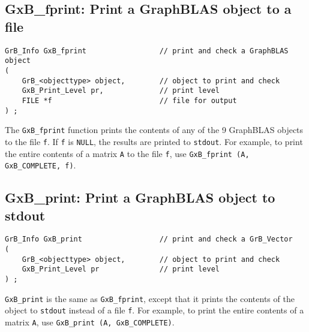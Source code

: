 \documentclass[12pt]{article}
\begin{document}
\newpage
\subsection{{\sf GxB\_fprint:} Print a GraphBLAS object to a file} %

\begin{mdframed}[userdefinedwidth=6in]
{\footnotesize
\begin{verbatim}
GrB_Info GxB_fprint                 // print and check a GraphBLAS object
(
    GrB_<objecttype> object,        // object to print and check
    GxB_Print_Level pr,             // print level
    FILE *f                         // file for output
) ;
\end{verbatim} } \end{mdframed}

The \verb'GxB_fprint' function prints the contents of any of the 9 GraphBLAS
objects to the file \verb'f'.  If \verb'f' is \verb'NULL', the results are
printed to \verb'stdout'.  For example, to print the entire contents of a
matrix \verb'A' to the file \verb'f', use
\verb'GxB_fprint (A, GxB_COMPLETE, f)'.

\subsection{{\sf GxB\_print:} Print a GraphBLAS object to {\sf stdout}} %
\label{gxb_print}

\begin{mdframed}[userdefinedwidth=6in]
{\footnotesize
\begin{verbatim}
GrB_Info GxB_print                  // print and check a GrB_Vector
(
    GrB_<objecttype> object,        // object to print and check
    GxB_Print_Level pr              // print level
) ;
\end{verbatim} } \end{mdframed}

\verb'GxB_print' is the same as \verb'GxB_fprint', except that it prints the
contents of the object to \verb'stdout' instead of a file \verb'f'.  For
example, to print the entire contents of a matrix \verb'A',  use
\verb'GxB_print (A, GxB_COMPLETE)'.
\end{document}
